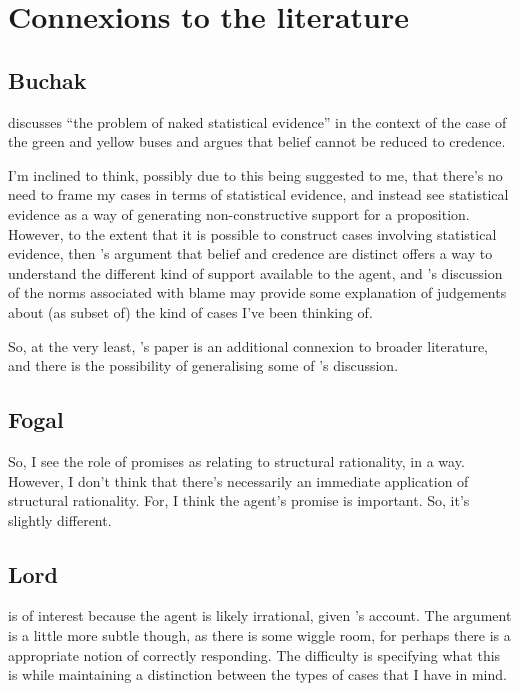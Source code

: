 \documentclass[10pt]{article}
\begin{document}
\section{Connexions to the literature}
\label{sec:conn-liter}

\subsection{Buchak}
\label{sec:buchak}

\textcite{Buchak:2014aa} discusses ``the problem of naked statistical evidence'' in the context of the case of the green and yellow buses and argues that belief cannot be reduced to credence.

I'm inclined to think, possibly due to this being suggested to me, that there's no need to frame my cases in terms of statistical evidence, and instead see statistical evidence as a way of generating non-constructive support for a proposition.
However, to the extent that it is possible to construct cases involving statistical evidence, then \citeauthor{Buchak:2014aa}'s argument that belief and credence are distinct offers a way to understand the different kind of support available to the agent, and \citeauthor{Buchak:2014aa}'s discussion of the norms associated with blame may provide some explanation of judgements about (as subset of) the kind of cases I've been thinking of.

So, at the very least, \citeauthor{Buchak:2014aa}'s paper is an additional connexion to broader literature, and there is the possibility of generalising some of \citeauthor{Buchak:2014aa}'s discussion.

\subsection{Fogal}
\label{sec:fogal}

So, I see the role of promises as relating to structural rationality, in a way.
However, I don't think that there's necessarily an immediate application of structural rationality.
For, I think the agent's promise is important.
So, it's slightly different.

\subsection{Lord}
\label{sec:lord}

\citeauthor{Lord:2018aa} is of interest because the agent is likely irrational, given \citeauthor{Lord:2018aa}'s account.
The argument is a little more subtle though, as there is some wiggle room, for perhaps there is a appropriate notion of correctly responding.
The difficulty is specifying what this is while maintaining a distinction between the types of cases that I have in mind.
\end{document}
